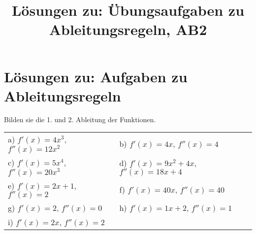 \documentclass[10pt,a4paper]{article}
\begin{document}
	
\title{Lösungen zu: Übungsaufgaben zu Ableitungsregeln, AB2}

\makeatletter
\def\@maketitle{%
  \newpage
  \null
  \vskip 2em%
  \begin{center}%
  \let \footnote \thanks
    {\Huge\bfseries\@title \par}%
    \vskip 1.5em%
    {\large
      \lineskip .5em%
      \begin{tabular}[t]{c}%
        \@author
      \end{tabular}\par}%
    \vskip 1em%
    {\large \@date}%
  \end{center}%
  \par
  \vskip 1.5em}
\makeatother

\author{}
\date{}

\maketitle

\section*{Lösungen zu: Aufgaben zu Ableitungsregeln}
Bilden sie die 1. und 2. Ableitung der Funktionen. \newline

\begin{tabular}{l l}
	a) $f'(x) = 4x^3$, $f''(x) = 12x^2$ & b) $f'(x) = 4x$, $f''(x) = 4$  \\      
	c) $f'(x) = 5x^4$, $f''(x) = 20x^3$ & d) $f'(x) = 9x^2 + 4x$, $f''(x) = 18x + 4$ \\ 
	e) $f'(x) = 2x + 1$, $f''(x) = 2$   & f) $f'(x) = 40x$, $f''(x) = 40$ \\
	g) $f'(x) = 2$, $f''(x) = 0$        & h) $f'(x) = 1x + 2$, $f''(x) = 1$ \\
	i) $f'(x) = 2x$, $f''(x) = 2$ 

\end{tabular}
\end{document}
